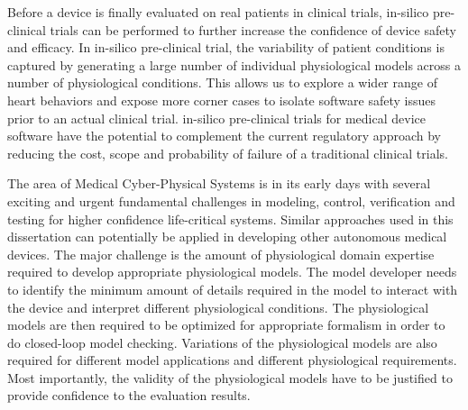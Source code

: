 Before a device is finally evaluated on real patients in clinical trials, in-silico pre-clinical trials can be performed to further increase the confidence of device safety and efficacy.
In in-silico pre-clinical trial, the variability of patient conditions is captured by generating a large number of individual physiological models across a number of physiological conditions. 
This allows us to explore a wider range of heart behaviors and expose more corner cases to isolate software safety issues prior to an actual clinical trial. 
in-silico pre-clinical trials for medical device software have the potential to complement the current regulatory approach by reducing the cost, scope and probability of failure of a traditional clinical trials. 

The area of Medical Cyber-Physical Systems is in its early days with several exciting and urgent fundamental challenges in modeling, control, verification and testing for higher confidence life-critical systems.
Similar approaches used in this dissertation can potentially be applied in developing other autonomous medical devices.
The major challenge is the amount of physiological domain expertise required to develop appropriate physiological models. 
The model developer needs to identify the minimum amount of details required in the model to interact with the device and interpret different physiological conditions.
The physiological models are then required to be optimized for appropriate formalism in order to do closed-loop model checking.
Variations of the physiological models are also required for different model applications and different physiological requirements.
Most importantly, the validity of the physiological models have to be justified to provide confidence to the evaluation results.


